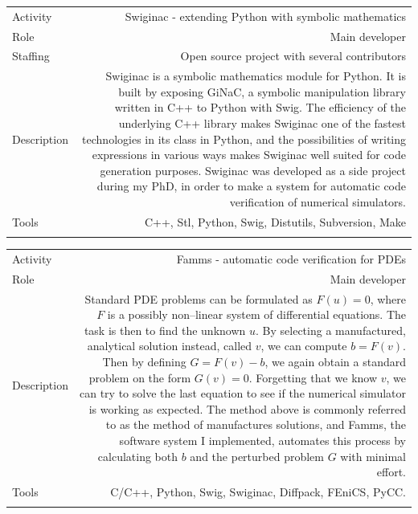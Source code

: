 \documentclass[english,a4paper,11pt]{article}
\begin{document}
\begin{tabular}{@{}LR}
Activity & Swiginac - extending Python with symbolic mathematics\\
Role & Main developer\\
Staffing & Open source project with several contributors\\
Description & Swiginac is a symbolic mathematics module for Python. It is built by exposing GiNaC, a symbolic manipulation library written in C++ to Python with Swig. The efficiency of the underlying C++ library makes Swiginac one of the fastest technologies in its class in Python, and the possibilities of writing expressions in various ways makes Swiginac well suited for code generation purposes. Swiginac was developed as a side project during my PhD, in order to make a system for automatic code verification of numerical simulators.\\
Tools & C++, Stl, Python, Swig, Distutils, Subversion, Make\\ 
\addlinespace \bottomrule[.1pt] \addlinespace
   \end{tabular}

\begin{tabular}{@{}LR}
Activity & Famms - automatic code verification for PDEs\\
Role & Main developer\\
Description & Standard PDE problems can be formulated as $F(u)=0$, where $F$ is a possibly non--linear system of differential equations. The task is then to find the unknown $u$. By selecting a manufactured, analytical solution instead, called $v$, we can compute $b=F(v)$. Then by defining $G = F(v)-b$, we again obtain a standard problem on the form $G(v)=0$. Forgetting that we know $v$, we can try to solve the last equation to see if the numerical simulator is working as expected. The method above is commonly referred to as the method of manufactures solutions, and Famms, the software system I implemented, automates this process by calculating both $b$ and the perturbed problem $G$ with minimal effort.\\
Tools & C/C++, Python, Swig, Swiginac, Diffpack, FEniCS, PyCC.\\ 
\addlinespace \bottomrule[.1pt] \addlinespace
   \end{tabular}
\end{document}
